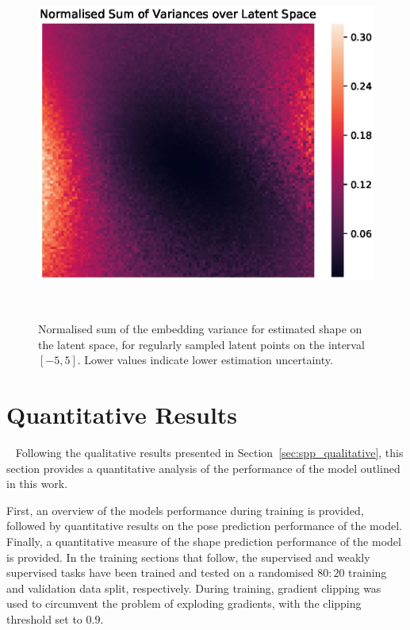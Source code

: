 \begin{figure}[!htbp]
  \centering
  \includegraphics[width=\linewidth]{figures/spp/gp_latent_heatmap.eps}
  \caption[Latent Space Variance]{Normalised sum of the embedding variance for estimated shape on the latent 
  space, for regularly sampled latent points on the interval \( \left[-5, 5\right] \). Lower values indicate 
  lower estimation uncertainty.}
~\label{figure:spp_qualitative_latent_cov}
\end{figure}

\section{Quantitative Results}
~\label{sec:spp_quantitative}
Following the qualitative results presented in Section~\ref{sec:spp_qualitative}, this section 
provides a quantitative analysis of the performance of the model outlined in this work.

First, an overview of the models performance during training is provided, followed by quantitative 
results on the pose prediction performance of the model. Finally, a quantitative measure of the 
shape prediction performance of the model is provided. In the training sections that follow, the supervised 
and weakly supervised tasks have been trained and tested on a randomised \( 80:20 \) training and validation 
data split, respectively. During training, gradient clipping was used to circumvent the problem of 
exploding gradients, with the clipping threshold set to \( 0.9 \).

